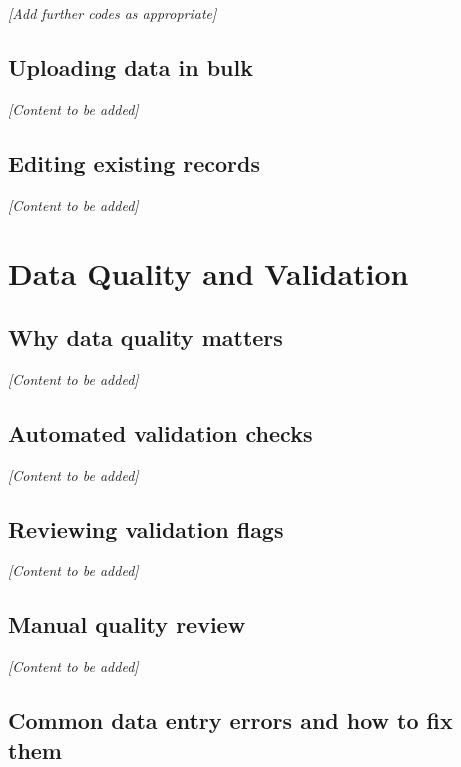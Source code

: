 \documentclass[
]{book}
\begin{document}
\emph{{[}Add further codes as appropriate{]}}

\section{Uploading data in bulk}\label{uploading-data-in-bulk}

\emph{{[}Content to be added{]}}

\section{Editing existing records}\label{editing-existing-records}

\emph{{[}Content to be added{]}}

\chapter{Data Quality and Validation}\label{data-quality}

\section{Why data quality matters}\label{why-data-quality-matters}

\emph{{[}Content to be added{]}}

\section{Automated validation checks}\label{automated-validation-checks}

\emph{{[}Content to be added{]}}

\section{Reviewing validation flags}\label{reviewing-validation-flags}

\emph{{[}Content to be added{]}}

\section{Manual quality review}\label{manual-quality-review}

\emph{{[}Content to be added{]}}

\section{Common data entry errors and how to fix them}\label{common-data-entry-errors-and-how-to-fix-them}
\end{document}
